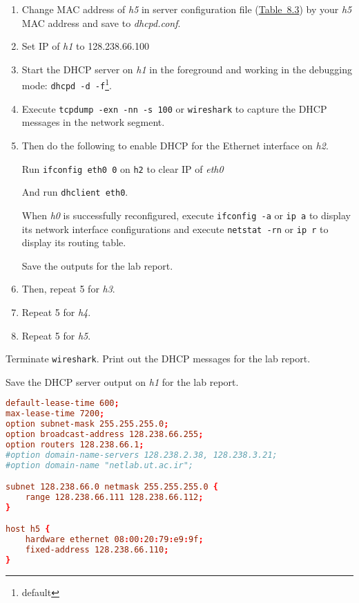 \documentclass{../UTNetLab}
\begin{document}
    \begin{enumerate}
        \item Change MAC address of \textit{h5} in server configuration file (\hyperref[tab:8.3]{Table~8.3}) by your \textit{h5} MAC address and save to \textit{dhcpd.conf}.
        
        \item Set IP of \textit{h1} to {128.238.66.100}
        
        \item Start the DHCP server on \textit{h1} in the foreground and working in the debugging mode: \lstinline{dhcpd -d -f}\footnote{default }.
        
        \item Execute \lstinline{tcpdump -exn -nn -s 100} or \lstinline{wireshark} to capture the DHCP messages in the network segment.
        
        \item Then do the following to enable DHCP for the Ethernet interface on \textit{h2}.

        Run \lstinline{ifconfig eth0 0} on \lstinline{h2} to clear IP of \textit{eth0}

        And run \lstinline{dhclient eth0}.

        When \textit{h0} is successfully reconfigured, execute \lstinline{ifconfig -a} or \lstinline{ip a} to display its
        network interface configurations and execute \lstinline{netstat -rn} or \lstinline{ip r} to display its routing table.

        Save the outputs for the lab report.
        
        \item Then, repeat 5 for \textit{h3}.
        
        \item Repeat 5 for \textit{h4}.
        
        \item Repeat 5 for \textit{h5}.
    \end{enumerate}

    Terminate \lstinline{wireshark}.
    Print out the DHCP messages for the lab report.

    Save the DHCP server output on \textit{h1} for the lab report.

    \begin{lstlisting}[language={conf}, caption={A DHCP server configuration file (Table~8.3)\label{tab:8.3}}]
default-lease-time 600;
max-lease-time 7200;
option subnet-mask 255.255.255.0;
option broadcast-address 128.238.66.255;
option routers 128.238.66.1;
#option domain-name-servers 128.238.2.38, 128.238.3.21;
#option domain-name "netlab.ut.ac.ir";

subnet 128.238.66.0 netmask 255.255.255.0 {
    range 128.238.66.111 128.238.66.112;
}

host h5 {
    hardware ethernet 08:00:20:79:e9:9f;
    fixed-address 128.238.66.110;
}
    \end{lstlisting}
\end{document}
